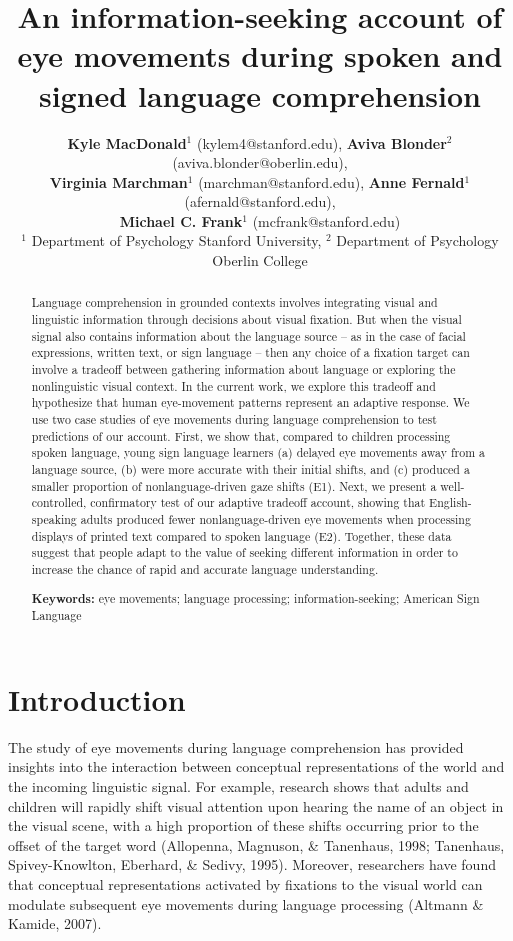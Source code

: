 \documentclass[10pt, letterpaper]{article}
\title{An information-seeking account of eye movements during spoken and signed
language comprehension}
\author{ {\large \bf Kyle MacDonald}$^1$ (kylem4@stanford.edu), {\large \bf Aviva Blonder}$^2$ (aviva.blonder@oberlin.edu), \\  {\large \bf Virginia Marchman}$^1$ (marchman@stanford.edu), {\large \bf Anne Fernald}$^1$ (afernald@stanford.edu), \\ {\large \bf Michael C. Frank}$^1$ (mcfrank@stanford.edu)  \\
   $^1$ Department of Psychology Stanford University, $^2$ Department of Psychology Oberlin College}
\begin{document}
\maketitle

\begin{abstract}
Language comprehension in grounded contexts involves integrating visual
and linguistic information through decisions about visual fixation. But
when the visual signal also contains information about the language
source -- as in the case of facial expressions, written text, or sign
language -- then any choice of a fixation target can involve a tradeoff
between gathering information about language or exploring the
nonlinguistic visual context. In the current work, we explore this
tradeoff and hypothesize that human eye-movement patterns represent an
adaptive response. We use two case studies of eye movements during
language comprehension to test predictions of our account. First, we
show that, compared to children processing spoken language, young sign
language learners (a) delayed eye movements away from a language source,
(b) were more accurate with their initial shifts, and (c) produced a
smaller proportion of nonlanguage-driven gaze shifts (E1). Next, we
present a well-controlled, confirmatory test of our adaptive tradeoff
account, showing that English-speaking adults produced fewer
nonlanguage-driven eye movements when processing displays of printed
text compared to spoken language (E2). Together, these data suggest that
people adapt to the value of seeking different information in order to
increase the chance of rapid and accurate language understanding.

\textbf{Keywords:}
eye movements; language processing; information-seeking; American Sign
Language
\end{abstract}

\section{Introduction}\label{introduction}

The study of eye movements during language comprehension has provided
insights into the interaction between conceptual representations of the
world and the incoming linguistic signal. For example, research shows
that adults and children will rapidly shift visual attention upon
hearing the name of an object in the visual scene, with a high
proportion of these shifts occurring prior to the offset of the target
word (Allopenna, Magnuson, \& Tanenhaus, 1998; Tanenhaus,
Spivey-Knowlton, Eberhard, \& Sedivy, 1995). Moreover, researchers have
found that conceptual representations activated by fixations to the
visual world can modulate subsequent eye movements during language
processing (Altmann \& Kamide, 2007).
\end{document}
